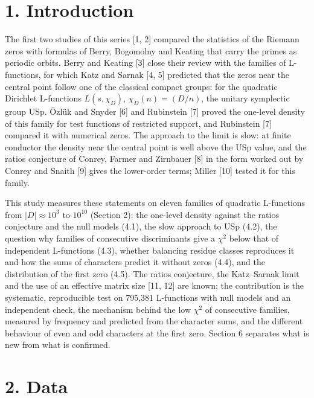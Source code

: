 \documentclass[
  10pt,
]{article}
\begin{document}
\hypertarget{introduction}{%
\section{1. Introduction}\label{introduction}}

The first two studies of this series {[}1, 2{]} compared the statistics
of the Riemann zeros with formulas of Berry, Bogomolny and Keating that
carry the primes as periodic orbits. Berry and Keating {[}3{]} close
their review with the families of L-functions, for which Katz and Sarnak
{[}4, 5{]} predicted that the zeros near the central point follow one of
the classical compact groups: for the quadratic Dirichlet L-functions
\(L(s, \chi_D)\), \(\chi_D(n) = (D/n)\), the unitary symplectic group
USp. Özlük and Snyder {[}6{]} and Rubinstein {[}7{]} proved the
one-level density of this family for test functions of restricted
support, and Rubinstein {[}7{]} compared it with numerical zeros. The
approach to the limit is slow: at finite conductor the density near the
central point is well above the USp value, and the ratios conjecture of
Conrey, Farmer and Zirnbauer {[}8{]} in the form worked out by Conrey
and Snaith {[}9{]} gives the lower-order terms; Miller {[}10{]} tested
it for this family.

This study measures these statements on eleven families of quadratic
L-functions from \(|D| \approx 10^3\) to \(10^{10}\) (Section 2): the
one-level density against the ratios conjecture and the null models
(4.1), the slow approach to USp (4.2), the question why families of
consecutive discriminants give a \(\chi^2\) below that of independent
L-functions (4.3), whether balancing residue classes reproduces it and
how the sums of characters predict it without zeros (4.4), and the
distribution of the first zero (4.5). The ratios conjecture, the
Katz--Sarnak limit and the use of an effective matrix size {[}11, 12{]}
are known; the contribution is the systematic, reproducible test on
795,381 L-functions with null models and an independent check, the
mechanism behind the low \(\chi^2\) of consecutive families, measured by
frequency and predicted from the character sums, and the different
behaviour of even and odd characters at the first zero. Section 6
separates what is new from what is confirmed.

\hypertarget{data}{%
\section{2. Data}\label{data}}
\end{document}
